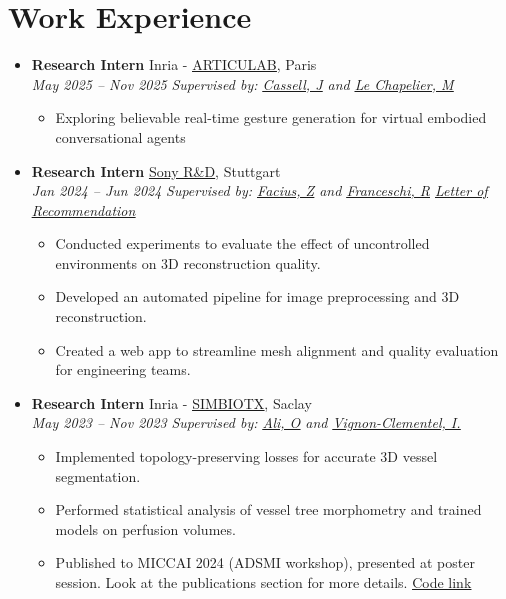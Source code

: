 \documentclass[letterpaper,11pt,twocolumn]{article}
\newcommand{\resumeItem}[1]{\item \small{#1}}
\newcommand{\resumeSubheading}[4]{
	\vspace{-2pt}\item \textbf{#1} \hfill #2 \\
	\textit{\small #3} \hfill \textit{\small #4} 
	\vspace{-7pt}
}
\newcommand{\resumeItemListStart}{\begin{itemize}[leftmargin=*]}
\newcommand{\resumeItemListEnd}{\end{itemize}\vspace{-5pt}}
\begin{document}
	\section{Work Experience}
	\begin{itemize}[leftmargin=*]
		\resumeSubheading
		{Research Intern}{Inria - \href{https://articulab.hcii.cs.cmu.edu/}{\underline{ARTICULAB}}, Paris}{May 2025 -- Nov 2025}{\textit{Supervised by: \href{https://scholar.google.com/citations?user=wkC9xHMAAAAJ&hl=en}{\underline{Cassell, J}} and \href{https://fr.linkedin.com/in/marius-le-chapelier-7694b5172}{\underline{Le Chapelier, M}}}} 
	
	\resumeItemListStart
	\resumeItem{Exploring believable real-time gesture generation for virtual embodied conversational agents}
	\resumeItemListEnd
	
	\resumeSubheading
	{Research Intern}{\href{https://www.sony.com/en/SonyInfo/research/about/stuttgart-laboratory1/}{\underline{Sony R\&D}}, Stuttgart}{Jan 2024 -- Jun 2024}{\textit{Supervised by: \href{https://de.linkedin.com/in/zoltan-facius-6b424112}{\underline{Facius, Z}} and \href{https://de.linkedin.com/in/roberto-franceschi}{\underline{Franceschi, R}}} \vspace{5pt} \href{https://machtayassine.github.io/resume/Sony_LoR.pdf}{\underline{\textit{Letter of Recommendation}}}}
	
	\resumeItemListStart
	\resumeItem{Conducted experiments to evaluate the effect of uncontrolled environments on 3D reconstruction quality.}
	\resumeItem{Developed an automated pipeline for image preprocessing and 3D reconstruction.}
	\resumeItem{Created a web app to streamline mesh alignment and quality evaluation for engineering teams.}
	\resumeItemListEnd
	
	\resumeSubheading
	{Research Intern}{Inria - \href{https://team.inria.fr/simbiotx/}{\underline{SIMBIOTX}}, Saclay}{May 2023 -- Nov 2023}{\textit{Supervised by: \href{https://scholar.google.com/citations?user=tKRo0ewAAAAJ&hl=en}{\underline{Ali, O}} and \href{https://team.inria.fr/simbiotx/team-members/irene-vignon-clementel/}{\underline{Vignon-Clementel, I.}}}}
	
	\resumeItemListStart
	\resumeItem{Implemented topology-preserving losses for accurate 3D vessel segmentation.}
	\resumeItem{Performed statistical analysis of vessel tree morphometry and trained models on perfusion volumes.}
	\resumeItem{Published to MICCAI 2024 (ADSMI workshop), presented at poster session. Look at the publications section for more details.} \underline{\href{https://gitlab.inria.fr/simbiotx/LiverVesselSeg}{Code link}}
	\resumeItemListEnd
	

\end{itemize}
\end{document}
